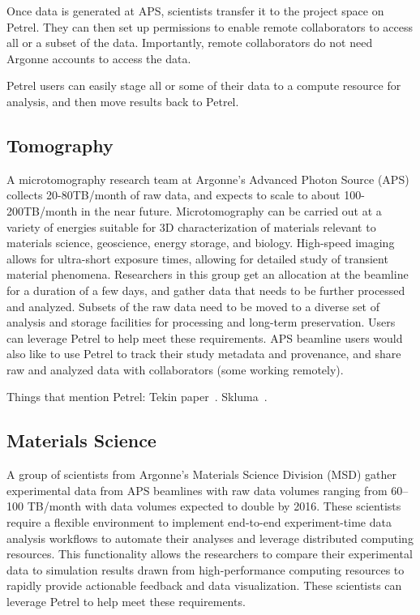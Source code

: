 \documentclass[sigconf]{acmart}
\begin{document}
Once data is generated at APS, scientists transfer it to the project space on Petrel. 
They can then set up permissions to enable remote collaborators to access all or a subset of the data. 
Importantly, remote collaborators do not need Argonne accounts to access the data.

Petrel users can easily stage all or some of their data to a compute resource for analysis, and then move results back to Petrel.

\subsection{Tomography}

A microtomography research team at Argonne's Advanced Photon Source (APS) collects 20-80TB/month of raw data, and expects to scale to about 100-200TB/month in the near future. Microtomography can be carried out at a variety of energies suitable for 3D characterization of materials relevant to materials science, geoscience, energy storage, and biology. High-speed imaging allows for ultra-short exposure times, allowing for detailed study of transient material phenomena. Researchers in this group get an allocation at the beamline for a duration of a few days, and gather data that needs to be further processed and analyzed. Subsets of the raw data need to be moved to a diverse set of analysis and storage facilities for processing and long-term preservation. Users can leverage Petrel to help meet these requirements. APS beamline users would also like to use Petrel to track their study metadata and provenance, and share raw and analyzed data with collaborators (some working remotely).

Things that mention Petrel: Tekin paper~\cite{bicer2016optimization}. Skluma~\cite{beckman2017skluma}.

\subsection{Materials Science}

A group of scientists from Argonne's Materials Science Division (MSD) gather experimental data from APS beamlines with raw data volumes ranging from 60--100 TB/month with data volumes expected to double by 2016. These scientists require a flexible environment to implement end-to-end experiment-time data analysis workflows to automate their analyses and leverage distributed computing resources. This functionality allows the researchers to compare their experimental data to simulation results drawn from high-performance computing resources to rapidly provide actionable feedback and data visualization. These scientists can leverage Petrel to help meet these requirements.
\end{document}
